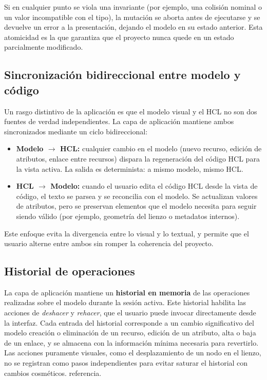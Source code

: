 \documentclass{article}
\begin{document}
{        \justify
        Si en cualquier punto se viola una invariante (por ejemplo, una
        colisión nominal o un valor incompatible con el tipo), la mutación se
        aborta antes de ejecutarse y se devuelve un error a la presentación,
        dejando el modelo en su estado anterior. Esta atomicidad es la que
        garantiza que el proyecto nunca quede en un estado parcialmente
        modificado.

        \subsection{Sincronización bidireccional entre modelo y código}
        \justify
        Un rasgo distintivo de la aplicación es que el modelo visual y el HCL no son
        dos fuentes de verdad independientes. La capa de aplicación mantiene ambos
        sincronizados mediante un ciclo bidireccional:

        \begin{itemize}
            \item \textbf{Modelo $\rightarrow$ HCL:} cualquier cambio en el modelo (nuevo
            recurso, edición de atributos, enlace entre recursos) dispara la
            regeneración del código HCL para la vista activa. La salida es
            determinista: a mismo modelo, mismo HCL.
            \item \textbf{HCL $\rightarrow$ Modelo:} cuando el usuario edita el
            código HCL desde la vista de código, el texto se parsea y se reconcilia
            con el modelo. Se actualizan valores de atributos, pero se preservan
            elementos que el modelo necesita para seguir siendo válido (por ejemplo,
            geometría del lienzo o metadatos internos).
        \end{itemize}

        \justify
        Este enfoque evita la divergencia entre lo visual y lo textual, y permite que
        el usuario alterne entre ambos sin romper la coherencia del proyecto.

        \subsection{Historial de operaciones}
        \justify
        La capa de aplicación mantiene
        un \textbf{historial en memoria} de las operaciones realizadas sobre el
        modelo durante la sesión activa. Este historial habilita las acciones de
        \textit{deshacer} y \textit{rehacer}, que el usuario puede invocar
        directamente desde la interfaz. Cada entrada del historial corresponde a
        un cambio significativo del modelo  creación o eliminación
        de un recurso, edición de un atributo, alta o baja de un enlace, y se almacena con la información mínima necesaria para
        revertirlo. Las acciones puramente visuales, como el desplazamiento de
        un nodo en el lienzo, no se registran como pasos independientes para
        evitar saturar el historial con cambios cosméticos.
        referencia.

}
\end{document}

